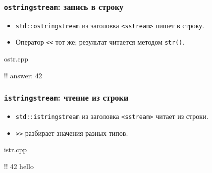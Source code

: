 \documentclass[compress, 8pt, aspectratio=169]{beamer}
\begin{document}
  \begin{frame}[fragile]

    \frametitle{\texttt{ostringstream}: запись в строку}

    \begin{itemize}

      \item \texttt{std::ostringstream} из заголовка
        \texttt{<sstream>} пишет в строку.

      \item Оператор \texttt{<<} тот же; результат читается
        методом \texttt{str()}.

    \end{itemize}

        {ostr.cpp}

    \begin{terminalwindow17}
!!
answer: 42
    \end{terminalwindow17}

  \end{frame}

  \begin{frame}[fragile]

    \frametitle{\texttt{istringstream}: чтение из строки}

    \begin{itemize}

      \item \texttt{std::istringstream} из заголовка
        \texttt{<sstream>} читает из строки.

      \item \texttt{>>} разбирает значения разных типов.

    \end{itemize}

        {istr.cpp}

    \begin{terminalwindow17}
!!
42 hello
    \end{terminalwindow17}

  \end{frame}
\end{document}
